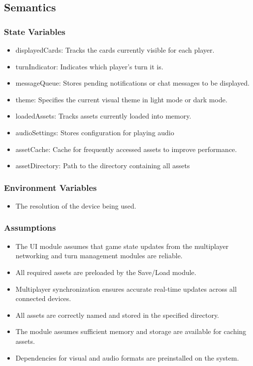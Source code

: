 \documentclass[12pt, titlepage]{article}
\begin{document}
\subsection{Semantics}

\subsubsection{State Variables}
\begin{itemize}
\item displayedCards: Tracks the cards currently visible for each player.
\item turnIndicator: Indicates which player’s turn it is.
\item messageQueue: Stores pending notifications or chat messages to be displayed.
\item theme: Specifies the current visual theme in light mode or dark mode.
\item loadedAssets: Tracks assets currently loaded into memory.
\item audioSettings: Stores configuration for playing audio
\item assetCache: Cache for frequently accessed assets to improve performance.
\item assetDirectory: Path to the directory containing all assets 

\end{itemize}

\subsubsection{Environment Variables}
\begin{itemize}
\item The resolution of the device being used.
\end{itemize}

\subsubsection{Assumptions}
\begin{itemize}
\item The UI module assumes that game state updates from the multiplayer networking and turn management modules are reliable.
\item All required assets are preloaded by the Save/Load module.
\item Multiplayer synchronization ensures accurate real-time updates across all connected devices.
\item All assets are correctly named and stored in the specified directory.
\item The module assumes sufficient memory and storage are available for caching assets.
\item Dependencies for visual and audio formats are preinstalled on the system.
\end{itemize}
\end{document}
